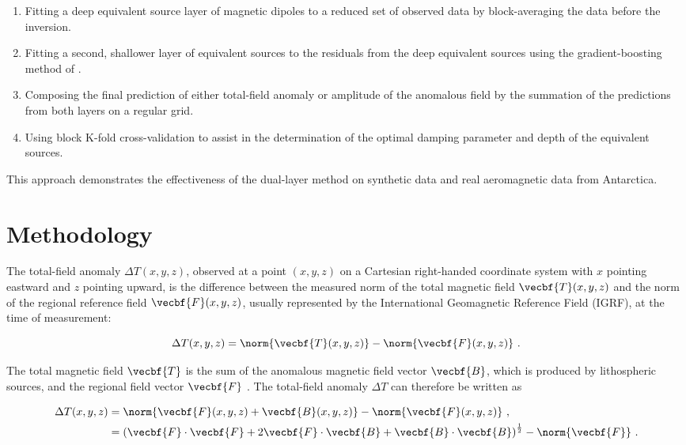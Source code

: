 \begin{enumerate}
  \item Fitting a deep equivalent source layer of magnetic dipoles to a reduced set of observed data by block-averaging the data before the inversion.
  \item Fitting a second, shallower layer of equivalent sources to the residuals from the deep equivalent sources using the gradient-boosting method of \citet{Soler2021}.
  \item Composing the final prediction of either total-field anomaly or amplitude of the anomalous field by the summation of the predictions from both layers on a regular grid.
  \item Using block K-fold cross-validation to assist in the determination of the optimal damping parameter and depth of the equivalent sources.
\end{enumerate}

\noindent
This approach demonstrates the effectiveness of the dual-layer method on synthetic data and real aeromagnetic data from Antarctica.


\section{Methodology}

The total-field anomaly $\Delta T(x, y, z)$, observed at a point $(x, y, z)$ on a Cartesian right-handed coordinate system with $x$ pointing eastward and $z$ pointing upward, is the difference between the measured norm of the total magnetic field $\vecbf{T}(x, y, z)$ and the norm of the regional reference field $\vecbf{F}(x, y, z)$, usually represented by the International Geomagnetic Reference Field (IGRF), at the time of measurement:

\begin{equation}
    \Delta T(x, y, z) =
    \norm{\vecbf{T}(x, y, z)}
    - \norm{\vecbf{F}(x, y, z)}
    \ .
\end{equation}

\noindent
The total magnetic field $\vecbf{T}$ is the sum of the anomalous magnetic field vector $\vecbf{B}$, which is produced by lithospheric sources, and the regional field vector $\vecbf{F}$ \citep{Blakley1995, Langel1998, OliveiraJr2015}. The total-field anomaly $\Delta T$ can therefore be written as

\begin{align}
    \label{eq:tfa-definition}
    \Delta T(x, y, z) &=
    \norm{\vecbf{F}(x, y, z) + \vecbf{B}(x, y, z)} - \norm{\vecbf{F}(x, y, z)}\ ,
    \\
    &= \left(
        \vecbf{F} \cdot \vecbf{F} 
        + 2\vecbf{F} \cdot \vecbf{B} 
        + \vecbf{B} \cdot \vecbf{B}
        \right)^{\frac{1}{2}} 
    - \norm{\vecbf{F}}
    \ .
\end{align}

